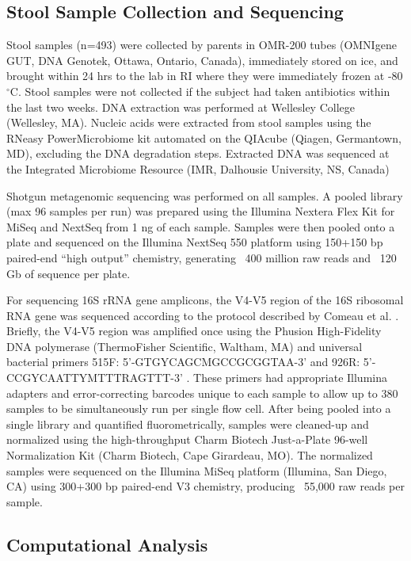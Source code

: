 \documentclass[fleqn,10pt]{wlscirep}
\begin{document}
\subsection*{Stool Sample Collection and Sequencing}

Stool samples (n=493) were collected by parents in OMR-200 tubes (OMNIgene GUT, DNA Genotek, Ottawa, Ontario, Canada),
immediately stored on ice, and brought within 24 hrs to the lab in RI where they were immediately frozen at -80 $^{\circ}$C.
Stool samples were not collected if the subject had taken antibiotics within the last two weeks.
DNA extraction was performed at Wellesley College (Wellesley, MA).
Nucleic acids were extracted from stool samples using the RNeasy PowerMicrobiome kit
automated on the QIAcube (Qiagen, Germantown, MD), excluding the DNA degradation steps.
Extracted DNA was sequenced at the Integrated Microbiome Resource (IMR, Dalhousie University, NS, Canada)

Shotgun metagenomic sequencing was performed on all samples.
A pooled library (max 96 samples per run) was prepared using the Illumina Nextera Flex Kit for MiSeq and NextSeq from 1 ng of each sample.
Samples were then pooled onto a plate and sequenced
on the Illumina NextSeq 550 platform using 150+150 bp paired-end “high output” chemistry,
generating ~400 million raw reads and ~120 Gb of sequence per plate.

For sequencing 16S rRNA gene amplicons,
the V4-V5 region of the 16S ribosomal RNA gene was sequenced according to the protocol
described by Comeau et al. \cite{Comeau2017-jg}.
Briefly, the V4-V5 region was amplified once using the Phusion High-Fidelity DNA polymerase
(ThermoFisher Scientific, Waltham, MA) and universal bacterial primers
515F: 5’-GTGYCAGCMGCCGCGGTAA-3’ and 926R: 5’-CCGYCAATTYMTTTRAGTTT-3’ \cite{Parada2016-uz,Walters2016-fi}.
These primers had appropriate Illumina adapters and error-correcting barcodes unique to each sample
to allow up to 380 samples to be simultaneously run per single flow cell.
After being pooled into a single library and quantified fluorometrically,
samples were cleaned-up and normalized using the high-throughput Charm Biotech Just-a-Plate 96-well Normalization Kit (Charm Biotech, Cape Girardeau, MO).
The normalized samples were sequenced on the Illumina MiSeq platform (Illumina, San Diego, CA)
using 300+300 bp paired-end V3 chemistry, producing ~55,000 raw reads per sample.

\subsection*{Computational Analysis}
\end{document}

